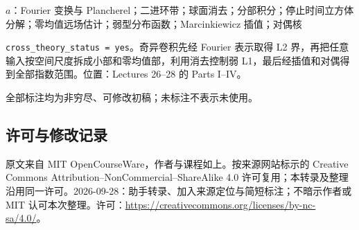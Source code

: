 \documentclass[UTF8,11pt]{ctexart}
\theoremstyle{definition}
\begin{document}
$a$：Fourier 变换与 Plancherel；二进环带；球面消去；分部积分；停止时间立方体分解；零均值远场估计；弱型分布函数；Marcinkiewicz 插值；对偶核

\texttt{cross\_theory\_status = yes}。奇异卷积先经 Fourier 表示取得 L2 界，再把任意输入按空间尺度拆成小部和零均值部，利用消去控制弱 L1，最后经插值和对偶得到全部指数范围。位置：Lectures 26--28 的 Parts I--IV。

全部标注均为非穷尽、可修改初稿；未标注不表示未使用。
\subsection*{许可与修改记录}
原文来自 MIT OpenCourseWare，作者与课程如上。按来源网站标示的 Creative Commons Attribution--NonCommercial--ShareAlike 4.0 许可复用；本转录及整理沿用同一许可。2026-09-28：助手转录、加入来源定位与简短标注；不暗示作者或 MIT 认可本次整理。许可：\url{https://creativecommons.org/licenses/by-nc-sa/4.0/}。
\end{document}
